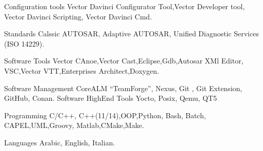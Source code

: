 

\begin{cvskills}

  \cvskill
    {\normalsize Configuration tools} %
    {\small Vector Davinci Configurator Tool,Vector Developer tool, Vector Davinci Scripting, Vector Davinci Cmd.} %

  \cvskill
    {\normalsize Standards} %
    {\small Calssic AUTOSAR, Adaptive AUTOSAR, Unified Diagnostic Services (ISO 14229).} %

  \cvskill
    {\normalsize Software Tools} %
    {\small Vector CAnoe,Vector Cast,Eclipse,Gdb,Autosar XMl Editor, VSC,Vector VTT,Enterprises Architect,Doxygen.} %

  \cvskill
    {\normalsize Software Management} %
    {\small CoreALM “TeamForge”, Nexus, Git , Git Extension, GitHub, Conan.} %
  \cvskill
    {\normalsize Software HighEnd Tools} %
    {\small Yocto, Posix, Qemu, QT5} %

  \cvskill
    {\normalsize Programming} %
    {\small C/C++, C++(11/14),OOP,Python, Bash, Batch, CAPEL,UML,Groovy, Matlab,CMake,Make.} %

  \cvskill
    {\normalsize Languages} %
    {\small Arabic, English, Italian.} %

\end{cvskills}
